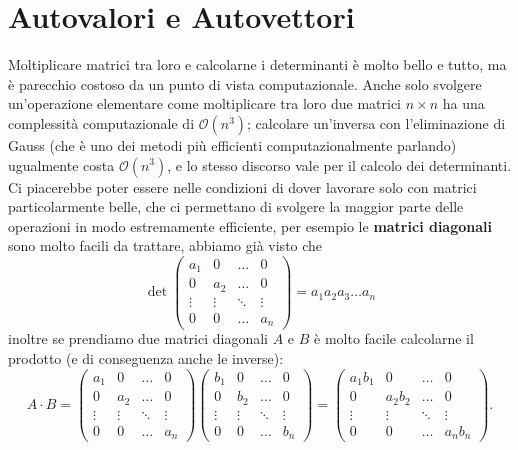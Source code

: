 \documentclass[11pt]{scrartcl}
\begin{document}
   	 \section{Autovalori e Autovettori} 
   	 Moltiplicare matrici tra loro e calcolarne i determinanti è molto bello e tutto, ma è parecchio costoso da un punto di vista computazionale. Anche solo svolgere un'operazione elementare come moltiplicare tra loro due matrici $n\times n$ ha una complessità computazionale di $\mathcal{O}\left(n^3\right)$; calcolare un'inversa con l'eliminazione di Gauss (che è uno dei metodi più efficienti computazionalmente parlando) ugualmente costa $\mathcal{O}\left(n^3\right)$, e lo stesso discorso vale per il calcolo dei determinanti. Ci piacerebbe poter essere nelle condizioni di dover lavorare solo con matrici particolarmente belle, che ci permettano di svolgere la maggior parte delle operazioni in modo estremamente efficiente, per esempio le \textbf{matrici diagonali} sono molto facili da trattare, abbiamo già visto che
   	 $$\det
   	 \begin{pmatrix}
   	 	a_1 & 0 & \dots & 0 \\
   	 	0 & a_2 & \dots & 0 \\
   	 	\vdots & \vdots & \ddots & \vdots \\
   	 	0 & 0 & \dots & a_n
   	 \end{pmatrix}=a_1a_2a_3\dots a_n
   	 $$
   	 inoltre se prendiamo due matrici diagonali $A$ e $B$ è molto facile calcolarne il prodotto (e di conseguenza anche le inverse):
   	 $$
   	 A \cdot B = 
   	 \begin{pmatrix}
   	 	a_1 & 0 & \dots & 0 \\
   	 	0 & a_2 & \dots & 0 \\
   	 	\vdots & \vdots & \ddots & \vdots \\
   	 	0 & 0 & \dots & a_n
   	 \end{pmatrix}
   	 \begin{pmatrix}
   	 	b_1 & 0 & \dots & 0 \\
   	 	0 & b_2 & \dots & 0 \\
   	 	\vdots & \vdots & \ddots & \vdots \\
   	 	0 & 0 & \dots & b_n
   	 \end{pmatrix}=
   	 \begin{pmatrix}
   	 	a_1b_1 & 0 & \dots & 0 \\
   	 	0 & a_2b_2 & \dots & 0 \\
   	 	\vdots & \vdots & \ddots & \vdots \\
   	 	0 & 0 & \dots & a_nb_n
   	 \end{pmatrix}.
   	 $$
\end{document}
